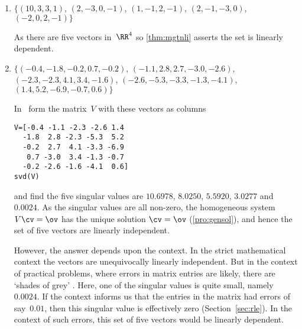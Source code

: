\begin{example}
\begin{enumerate}
\item \(\{(10,3,3,1)\), \(( 2,-3,0,-1)\), \(( 1,-1,2,-1)\), \(( 2,-1,-3,0)\), \((-2,0,2,-1)\}\)
\begin{solution} 
As there are five vectors in~\(\RR^4\) so \autoref{thm:mgtnli} asserts the set is linearly dependent.
\end{solution}



\item \(\{(-0.4,-1.8,-0.2, 0.7,-0.2)\), \((-1.1, 2.8, 2.7,-3.0,-2.6)\), \((-2.3,-2.3, 4.1, 3.4,-1.6)\), \((-2.6,-5.3,-3.3,-1.3,-4.1)\), \(( 1.4, 5.2,-6.9,-0.7, 0.6)\}\)
\begin{solution} 
In \script\ form the matrix~\(V\) with these vectors as columns
\begin{verbatim}
V=[-0.4 -1.1 -2.3 -2.6 1.4
  -1.8  2.8 -2.3 -5.3  5.2
  -0.2  2.7  4.1 -3.3 -6.9
   0.7 -3.0  3.4 -1.3 -0.7
  -0.2 -2.6 -1.6 -4.1  0.6]
svd(V)
\end{verbatim}
\setbox\ajrqrbox\hbox{}%
\marginpar{\usebox{\ajrqrbox}}%
and find the five singular values are \(10.6978\), \(8.0250\), \(5.5920\), \(3.0277\) and~\(0.0024\).
As the singular values are all non-zero, the homogeneous system \(V\cv=\ov\) has the unique solution \(\cv=\ov\) (\autoref{pro:gensol}), and hence the set of five vectors are linearly independent.

However, the answer depends upon the context.  
In the strict mathematical context the vectors are unequivocally linearly independent.
But in the context of practical problems, where errors in matrix entries are likely, there are `shades of grey' . 
Here, one of the singular values is quite small, namely~\(0.0024\).
If the context informs us that the entries in the matrix had errors of say~\(0.01\), then this singular value is effectively zero (Section~\ref{sec:rle}).
In the context of such errors, this set of five vectors would be  linearly dependent.
\end{solution}


\end{enumerate}
\end{example}













